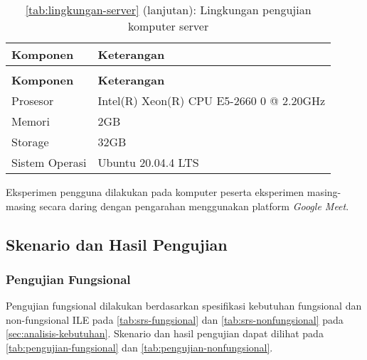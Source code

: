 \small
\begin{longtable}[c]{|l|l|}
  \caption{Lingkungan pengujian komputer server} \label{tab:lingkungan-server}                \\ \hline
  \rowcolor{gray!30}
  \textbf{Komponen} & \textbf{Keterangan}                                                     \\ \hline
  \endfirsthead
  \caption*{\autoref{tab:lingkungan-server} (lanjutan): Lingkungan pengujian komputer server} \\ \hline
  \rowcolor{gray!30}
  \textbf{Komponen} & \textbf{Keterangan}                                                     \\ \hline
  \endhead
  Prosesor          & Intel(R) Xeon(R) CPU E5-2660 0 @ 2.20GHz                                \\ \hline
  Memori            & 2GB                                                                     \\ \hline
  Storage           & 32GB                                                                    \\ \hline
  Sistem Operasi    & Ubuntu 20.04.4 LTS                                                      \\ \hline
\end{longtable}
\normalsize

Eksperimen pengguna dilakukan pada komputer peserta eksperimen masing-masing secara daring dengan pengarahan menggunakan platform \textit{Google Meet}.

\subsection{Skenario dan Hasil Pengujian}

\subsubsection{Pengujian Fungsional}
Pengujian fungsional dilakukan berdasarkan spesifikasi kebutuhan fungsional dan non-fungsional ILE pada \autoref{tab:srs-fungsional} dan \autoref{tab:srs-nonfungsional} pada \autoref{sec:analisis-kebutuhan}. Skenario dan hasil pengujian dapat dilihat pada \autoref{tab:pengujian-fungsional} dan \autoref{tab:pengujian-nonfungsional}.

